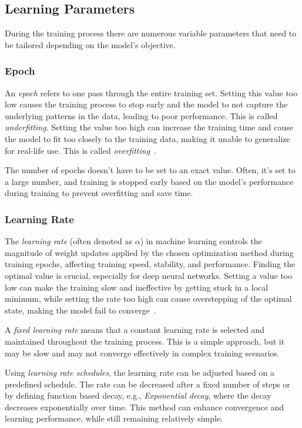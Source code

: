 \documentclass[a4paper,oneside,onecolumn,12pt]{book}
\begin{document}
	\subsection{Learning Parameters}
	During the training process there are numerous variable parameters that need to be tailored depending on the model's objective.
		\subsubsection{Epoch}
		An \textit{epoch} refers to one pass through the entire training set. Setting this value too low causes the training process to stop early and the model to not capture the underlying patterns in the data, leading to poor performance. This is called \textit{underfitting}. Setting the value too high can increase the training time and cause the model to fit too closely to the training data, making it unable to generalize for real-life use. This is called \textit{overfitting}~\cite{WIEML}.

		The number of epochs doesn't have to be set to an exact value. Often, it's set to a large number, and training is stopped early based on the model's performance during training to prevent overfitting and save time.

		\subsubsection{Learning Rate}
		The \textit{learning rate} (often denoted as $\alpha$) in machine learning controls the magnitude of weight updates applied by the chosen optimization method during training epochs, affecting training speed, stability, and performance. Finding the optimal value is crucial, especially for deep neural networks. Setting a value too low can make the training slow and ineffective by getting stuck in a local minimum, while setting the rate too high can cause overstepping of the optimal state, making the model fail to converge~\cite{MML}.

		A \textit{fixed learning rate} means that a constant learning rate is selected and maintained throughout the training process. This is a simple approach, but it may be slow and may not converge effectively in complex training scenarios.

		Using \textit{learning rate schedules}, the learning rate can be adjusted based on a predefined schedule. The rate can be decreased after a fixed number of steps or by defining function based decay, e.g., \textit{Exponential decay}, where the decay decreases exponentially over time. This method can enhance convergence and learning performance, while still remaining relatively simple. 
\end{document}

